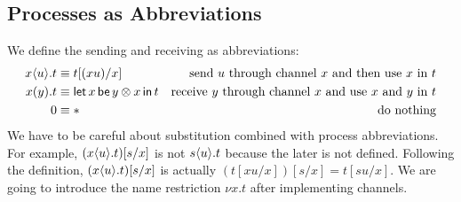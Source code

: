     \subsection{Processes as Abbreviations}

    We define the sending and receiving as abbreviations:
    \begin{align*}
     {x}\langle{u}\rangle.{t} &\equiv t[(xu) /x] &\text{send $u$ through channel
     $x$ and then use $x$ in $t$} \\
     {{x}({y}).{t}} &\equiv \mathsf{let }\,{x}\,\mathsf{ be }\,{y\otimes x}\,\mathsf{ in }\,{t} & \text{receive
     $y$ through channel $x$ and use $x$ and $y$ in $t$} \\
     0 &\equiv \ast &\text{do nothing}
    \end{align*}
    We have to be careful about substitution combined with process
    abbreviations.
    For example, $({x}\langle{u}\rangle.{t})[s/x]$ is not ${s}\langle{u}\rangle.{t}$
    because the later is not defined.  Following the definition,
    $({x}\langle{u}\rangle.{t})[s/x]$ is actually $(t[xu/x])[s/x] = t[su/x]$.
    We are going to introduce the name restriction $\nu x.t$ after
    implementing channels.

